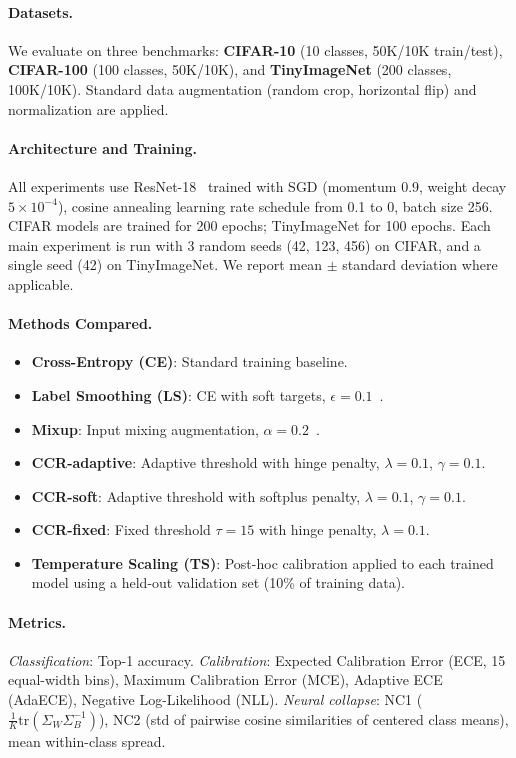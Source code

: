 \documentclass{article}
\begin{document}
\paragraph{Datasets.}
We evaluate on three benchmarks: \textbf{CIFAR-10} (10 classes, 50K/10K train/test), \textbf{CIFAR-100} (100 classes, 50K/10K), and \textbf{TinyImageNet} (200 classes, 100K/10K). Standard data augmentation (random crop, horizontal flip) and normalization are applied.

\paragraph{Architecture and Training.}
All experiments use ResNet-18~\citep{he2016deep} trained with SGD (momentum 0.9, weight decay $5 \times 10^{-4}$), cosine annealing learning rate schedule from 0.1 to 0, batch size 256. CIFAR models are trained for 200 epochs; TinyImageNet for 100 epochs. Each main experiment is run with 3 random seeds (42, 123, 456) on CIFAR, and a single seed (42) on TinyImageNet. We report mean $\pm$ standard deviation where applicable.

\paragraph{Methods Compared.}
\begin{itemize}
    \item \textbf{Cross-Entropy (CE)}: Standard training baseline.
    \item \textbf{Label Smoothing (LS)}: CE with soft targets, $\epsilon = 0.1$~\citep{szegedy2016rethinking}.
    \item \textbf{Mixup}: Input mixing augmentation, $\alpha = 0.2$~\citep{zhang2018mixup}.
    \item \textbf{CCR-adaptive}: Adaptive threshold with hinge penalty, $\lambda = 0.1$, $\gamma = 0.1$.
    \item \textbf{CCR-soft}: Adaptive threshold with softplus penalty, $\lambda = 0.1$, $\gamma = 0.1$.
    \item \textbf{CCR-fixed}: Fixed threshold $\tau = 15$ with hinge penalty, $\lambda = 0.1$.
    \item \textbf{Temperature Scaling (TS)}: Post-hoc calibration applied to each trained model using a held-out validation set (10\% of training data).
\end{itemize}

\paragraph{Metrics.}
\emph{Classification}: Top-1 accuracy. \emph{Calibration}: Expected Calibration Error (ECE, 15 equal-width bins), Maximum Calibration Error (MCE), Adaptive ECE (AdaECE), Negative Log-Likelihood (NLL). \emph{Neural collapse}: NC1 ($\frac{1}{K}\text{tr}(\Sigma_W \Sigma_B^{-1})$), NC2 (std of pairwise cosine similarities of centered class means), mean within-class spread.
\end{document}
